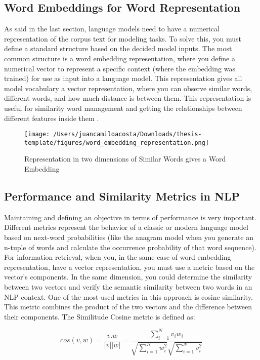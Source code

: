 \subsection{Word Embeddings for Word Representation}
As said in the last section, language models need to have a numerical representation of the corpus text for modeling tasks. To solve this, you must define a standard structure based on the decided model inputs. The most common structure is a word embedding representation, where you define a numerical vector to represent a specific context (where the embedding was trained) for use as input into a language model. This representation gives all model vocabulary a vector representation, where you can observe similar words, different words, and how much distance is between them. This representation is useful for similarity word management and getting the relationships between different features inside them \citet{nlp-fundamentals}. 

    \begin{figure}[H]
    \centering
    \texttt{[image: /Users/juancamiloacosta/Downloads/thesis-template/figures/word\_embedding\_representation.png]}
    \caption{Representation in two dimensions of Similar Words gives a Word Embedding \citet{nlp-fundamentals} }
    \label{fig:word-embedding}
    \end{figure}

\subsection{Performance and Similarity Metrics in NLP}
Maintaining and defining an objective in terms of performance is very important. Different metrics represent the behavior of a classic or modern language model based on next-word probabilities (like the anagram model when you generate an n-tuple of words and calculate the occurrence probability of that word sequence). For information retrieval, when you, in the same case of word embedding representation, have a vector representation, you must use a metric based on the vector's components. In the same dimension, you could determine the similarity between two vectors and verify the semantic similarity between two words in an NLP context. One of the most used metrics in this approach is cosine similarity. This metric combines the product of the two vectors and the difference between their components. The Similitude Cosine metric is defined as:

\begin{equation}
cos(v,w) = \frac{v.w}{|v||w|} = \frac{\sum_{i=1}^{N} v_{i}w_{i}}{\sqrt{\sum_{i=1}^{N} w_{i}^{2}} \sqrt{\sum_{i=1}^{N} v_{i}^{2}}}
\end{equation}

